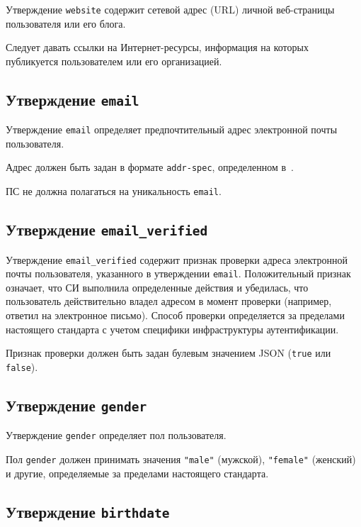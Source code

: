 Утверждение \lstinline{website} содержит сетевой адрес (URL) личной 
веб-страницы пользователя или его блога.

Следует давать ссылки на Интернет-ресурсы, информация на которых публикуется 
пользователем или его организацией.

\subsection{Утверждение \lstinline{email}}\label{CLAIMS.Email}

Утверждение \lstinline{email} определяет предпочтительный адрес электронной 
почты пользователя.

Адрес должен быть задан в формате \lstinline{addr-spec}, определенном 
в~\cite{RFC5322}.

ПС не должна полагаться на уникальность \lstinline{email}.

\subsection{Утверждение \lstinline{email_verified}}\label{CLAIMS.EmailVerified}

Утверждение \lstinline{email_verified} содержит признак проверки адреса
электронной почты пользователя, указанного в утверждении \lstinline{email}.
%
Положительный признак означает, что СИ выполнила определенные действия и
убедилась, что пользователь действительно владел адресом в момент проверки
(например, ответил на электронное письмо).
%
Способ проверки определяется за пределами настоящего стандарта с учетом 
специфики инфраструктуры аутентификации.  

Признак проверки должен быть задан булевым значением JSON
(\lstinline{true} или \lstinline{false}).

\subsection{Утверждение \lstinline{gender}}\label{CLAIMS.Gender}

Утверждение \lstinline{gender} определяет пол пользователя. 

Пол \lstinline{gender} должен принимать значения 
\lstinline{"male"} (мужской), \lstinline{"female"} (женский)
и другие, определяемые за пределами настоящего стандарта.

\subsection{Утверждение \lstinline{birthdate}}\label{CLAIMS.Birthdate}

